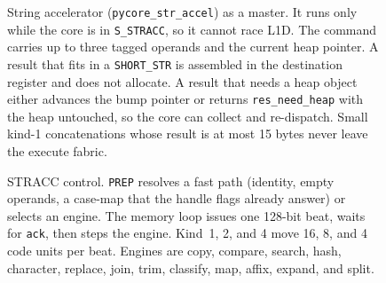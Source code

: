 \begin{figure}[htbp]
\centering
{}
\caption{String accelerator (\texttt{pycore\_str\_accel}) as a master.
It runs only while the core is in \texttt{S\_STRACC}, so it cannot race L1D.
The command carries up to three tagged operands and the current heap pointer.
A result that fits in a \texttt{SHORT\_STR} is assembled in the destination register and does not allocate.
A result that needs a heap object either advances the bump pointer or returns \texttt{res\_need\_heap} with the heap untouched, so the core can collect and re-dispatch.
Small kind-1 concatenations whose result is at most 15 bytes never leave the execute fabric.}
\label{fig:stracc-top}
\end{figure}

\begin{figure}[htbp]
\centering
{}
\caption{STRACC control.
\texttt{PREP} resolves a fast path (identity, empty operands, a case-map that the handle flags already answer) or selects an engine.
The memory loop issues one 128-bit beat, waits for \texttt{ack}, then steps the engine.
Kind~1, 2, and 4 move 16, 8, and 4 code units per beat.
Engines are copy, compare, search, hash, character, replace, join, trim, classify, map, affix, expand, and split.}
\label{fig:stracc-fsm}
\end{figure}

